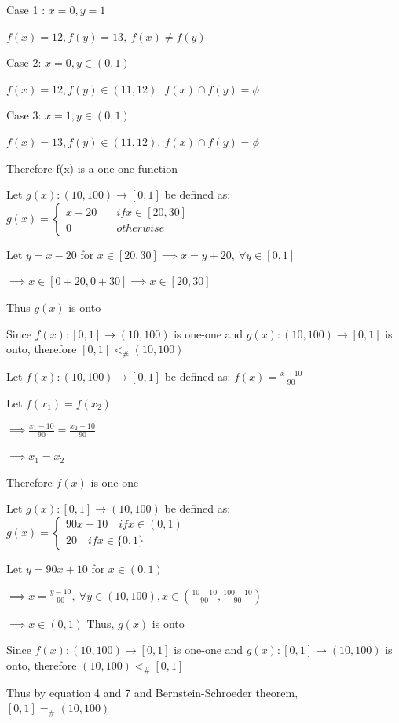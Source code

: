 \documentclass{article}
\begin{document}
    \quad Case 1 : $x=0, y=1$
    
    \quad $f(x)=12, f(y)=13, ~ f(x) \neq f(y)$
    
    \quad Case 2: $x=0, y \in (0, 1)$
    
    \quad $f(x)=12, f(y) \in (11, 12), ~f(x) \cap f(y) = \phi $
        
    \quad Case 3: $x=1, y \in (0, 1)$
    
    \quad $f(x)=13, f(y) \in (11, 12), ~f(x) \cap f(y) = \phi$
        
    \quad Therefore f(x) is a one-one function 
    
    \quad Let $g(x): (10, 100) \to [0, 1]$  be defined as:
    $g(x) = 
         \begin{cases}
           x-20 &\quad if x \in [20, 30] \\
           0 &\quad otherwise
         \end{cases}$
    
    \quad Let $y=x-20$ for $x \in[20, 30] \implies x=y+20, ~\forall y \in [0, 1] $
    
    \quad $\implies x \in [0+20, 0+30] \implies x \in [20, 30]$
    
    \quad Thus $g(x)$ is onto 
    
    \quad Since $f(x): [0,1] \to (10, 100)$ is one-one and $g(x): (10, 100) \to [0, 1]$ is onto, therefore $[0, 1] <_{\#} (10, 100)$ 
    
    
    \quad Let $f(x): (10, 100) \to [0, 1]$  be defined as:
    $f(x) =  \frac{x-10}{90}$
    
    \quad Let $ f(x_{1})=f(x_{2}) $
    
    \quad $\implies \frac{x_{1}-10}{90}=\frac{x_{2}-10}{90} $ 
    
    \quad $\implies x_{1}=x_{2}$ 
    
    \quad Therefore $f(x)$ is one-one 
    
    \quad Let $g(x): [0,1] \to (10, 100)$  be defined as:
    $g(x) = 
         \begin{cases}
           90x+10 \quad if x \in (0,1) \\
           20  \quad if x \in \{0, 1\} 
         \end{cases}$
        
    \quad Let $y=90x+10$ for $x \in (0,1)$
    
    \quad $\implies x=\frac{y-10}{90}, ~ \forall
     y \in (10, 100), x \in (\frac{10-10}{90}, \frac{100-10}{90}) $
     
    \quad $\implies x \in (0, 1) $
    \quad Thus, $g(x)$ is onto 
    
    \quad Since $f(x): (10, 100) \to [0, 1]$ is one-one and $g(x): [0,1] \to (10, 100)$ is onto, therefore $(10, 100) <_{\#} [0, 1]$ 
    
    
    \quad Thus by equation 4 and 7 and Bernstein-Schroeder theorem, $[0, 1] =_{\#} (10, 100) $
    
    
\end{document}
